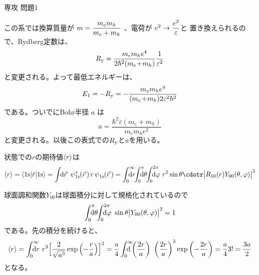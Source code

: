 \documentclass[fleqn]{jbook}
\begin{document}
\begin{answer}{専攻 問題1}{}
\def\WF#1{\psi\raisebox{-0.5ex}{\scriptsize$#1$}}
\def\WFHC#1{\psi\raisebox{1.0ex}{\hbox to 0pt{\scriptsize$\ast$\hss}}\raisebox{-0.5ex}{\scriptsize$#1$}}
\def\vr{\vec{r}\,}
\def\Comb#1#2{\mbox{\tiny$#1$}{\rm C}\mbox{\tiny$#2$}}
\def\HI{{\cal H}^\prime\,}
\def\zpar{\kern-0.7ex\raisebox{1.1ex}{\tiny$(0)$}}
\def\fpar{\kern-0.7ex\raisebox{1.1ex}{\tiny$(1)$}}


\begin{subanswers}
\SubAnswer
  \begin{subsubanswers}
  \SubSubAnswer 
    この系では換算質量が $m=\displaystyle\frac{m_em_h}{m_e+m_h}$
    、電荷が $e^2\rightarrow \displaystyle\frac{e^2}{\varepsilon}$と
    置き換えられるので、Rydberg定数は、\vspace*{-2mm}
%
    \[ R_{\rm y} = \frac{m_em_he^4}{2\hbar^2(m_e\!+\!m_h)} \frac{1}{\varepsilon^2} \]
%
    と変更される。よって最低エネルギーは、
%
    \[ E_1 = -R_{\rm y}%
           = -\frac{m_em_he^4}{(m_e\!+\!m_h)2\varepsilon^2\hbar^2} \]
%
    である。ついでにBohr半径 $a$ は
%
    \[ a = \frac{\hbar^2\varepsilon(m_e\!+\!m_h)}{m_em_he^2} \]
%
    と変更される。以後この表式での$R_{\rm y}$と$a$を用いる。

  \SubSubAnswer
    状態での$r$の期待値$\langle{r}\rangle$は
%
    \[ \Mean{r}%
       = \Bracket{\Orbit{1s}}{\hat{r}}{\Orbit{1s}}%
       =  \Uint{\d{\vr}}%
            \WFHC{\Orbit{1s}}(\vr)\,r\,\WF{\Orbit{1s}}(\vr)%
       =  \Dint{0}{\infty}{\d{r}}\bquad
          \Dint{0}{\pi}{\d{\theta}}\bquad%
          \Dint{0}{2\pi}{\d{\varphi}} r^2\sin\theta\cdot%
          r\bigl| R_{10}(r)Y_{00}(\theta,\varphi) \bigr|^2 \]

    球面調和関数$Y_{00}$は球面積分に対して規格化されているので
%
    \[ \Dint{0}{\pi}{\d{\theta}}\bquad\Dint{0}{2\pi}{\d{\varphi}}%
       \sin\theta\bigl|Y_{00}(\theta,\varphi)\bigr|^2 = 1 \]
%
    である。先の積分を続けると、
%
    \[ \Mean{r}%
       = \Dint{0}{\infty}{\d{r}} r^3 \Bigl[\frac{2}{\sqrt{a^3}}%
         \exp\left(-\frac{r}{a}\right)\Bigr]^2%
       = \frac{a}{4} \Dint{0}{\infty}{\d{\left(\frac{2r}{a}}\right)}%
         \left(\frac{2r}{a}\right)^3 \exp\left(-\frac{2r}{a}\right)%
       = \frac{a}{4}3! = \frac{3a}{2} \]
%
    となる。


  \end{subsubanswers}



\end{subanswers}
\end{answer}
\end{document}
